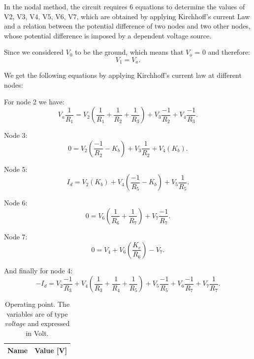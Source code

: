 In the nodal method, the circuit requires 6 equations to determine the values of V2, V3, V4, V5, V6, V7, which are obtained by applying Kirchhoff's current Law and a relation between the potential difference of two nodes and two other nodes, whose potential difference is imposed by a dependent voltage source. 

Since we considered $V_0$ to be the ground, which means that $V_o$ = 0 and therefore:
\begin{equation}
	V_1 = V_a.
	\label{eq:kvl}
\end{equation}

We get the following equations by applying Kirchhoff's current law at different nodes:

For node 2 we have:
\begin{equation}
	 V_a\frac{1}{R_1} = V_2(\frac{1}{R_1} + \frac{1}{R_2} + \frac{1}{R_3}) + V_3\frac{-1}{R_2} + V_4\frac{-1}{R_3}.
\end{equation}

Node 3:
\begin{equation}
	0 = V_2(\frac{-1}{R_2} - K_b) + V_3\frac{1}{R_2} + V_4(K_b).
\end{equation}

Node 5:
\begin{equation}
	I_d = V_2(K_b) + V_4(\frac{-1}{R_5} - K_b) + V_5\frac{1}{R_5}.
\end{equation}

Node 6:
\begin{equation}
	0 = V_6(\frac{1}{R_6} + \frac{1}{R_7}) + V_7\frac{-1}{R_7} .
\end{equation}

Node 7:
\begin{equation}
	0 = V_4 + V_6(\frac{K_c}{R_6}) - V_7 .
\end{equation}

And finally for node 4:
\begin{equation}
	-I_d = V_2\frac{-1}{R_3} + V_4(\frac{1}{R_3} + \frac{1}{R_4} + \frac{1}{R_5}) + V_5\frac{-1}{R_5} + V_6\frac{-1}{R_7} + V_7\frac{1}{R_7}.
\end{equation}

\begin{table}[h]
  \centering
  \begin{tabular}{|l|r|}
    \hline    
    {\bf Name} & {\bf Value [V]} \\ \hline
    
  \end{tabular}
  \caption{Operating point. The variables are of type {\it voltage} and expressed in
    Volt.}
  \label{tab:op}
\end{table}


